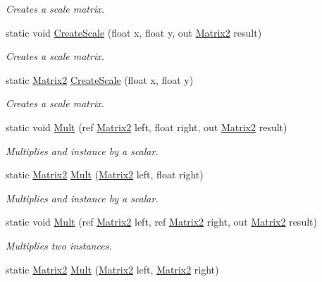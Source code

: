 \begin{DoxyCompactItemize}
\begin{DoxyCompactList}\small\item\em Creates a scale matrix. \end{DoxyCompactList}\item 
static void \hyperlink{struct_open_t_k_1_1_matrix2_ae69bb77589717aeb16ade1df7ac1b4d1}{Create\-Scale} (float x, float y, out \hyperlink{struct_open_t_k_1_1_matrix2}{Matrix2} result)
\begin{DoxyCompactList}\small\item\em Creates a scale matrix. \end{DoxyCompactList}\item 
static \hyperlink{struct_open_t_k_1_1_matrix2}{Matrix2} \hyperlink{struct_open_t_k_1_1_matrix2_a9b0c358ff84fa68bdc5f2bee457329e1}{Create\-Scale} (float x, float y)
\begin{DoxyCompactList}\small\item\em Creates a scale matrix. \end{DoxyCompactList}\item 
static void \hyperlink{struct_open_t_k_1_1_matrix2_ac358e5c0c410a101bfb7ae9de744d9e2}{Mult} (ref \hyperlink{struct_open_t_k_1_1_matrix2}{Matrix2} left, float right, out \hyperlink{struct_open_t_k_1_1_matrix2}{Matrix2} result)
\begin{DoxyCompactList}\small\item\em Multiplies and instance by a scalar. \end{DoxyCompactList}\item 
static \hyperlink{struct_open_t_k_1_1_matrix2}{Matrix2} \hyperlink{struct_open_t_k_1_1_matrix2_aa75f6d03cdd7a0e9e8d31a6fb428deba}{Mult} (\hyperlink{struct_open_t_k_1_1_matrix2}{Matrix2} left, float right)
\begin{DoxyCompactList}\small\item\em Multiplies and instance by a scalar. \end{DoxyCompactList}\item 
static void \hyperlink{struct_open_t_k_1_1_matrix2_ab2568c372f55f6393c2da408c4f05edc}{Mult} (ref \hyperlink{struct_open_t_k_1_1_matrix2}{Matrix2} left, ref \hyperlink{struct_open_t_k_1_1_matrix2}{Matrix2} right, out \hyperlink{struct_open_t_k_1_1_matrix2}{Matrix2} result)
\begin{DoxyCompactList}\small\item\em Multiplies two instances. \end{DoxyCompactList}\item 
static \hyperlink{struct_open_t_k_1_1_matrix2}{Matrix2} \hyperlink{struct_open_t_k_1_1_matrix2_a0c990a3f898de12cebb733caca576c79}{Mult} (\hyperlink{struct_open_t_k_1_1_matrix2}{Matrix2} left, \hyperlink{struct_open_t_k_1_1_matrix2}{Matrix2} right)

\end{DoxyCompactItemize}
